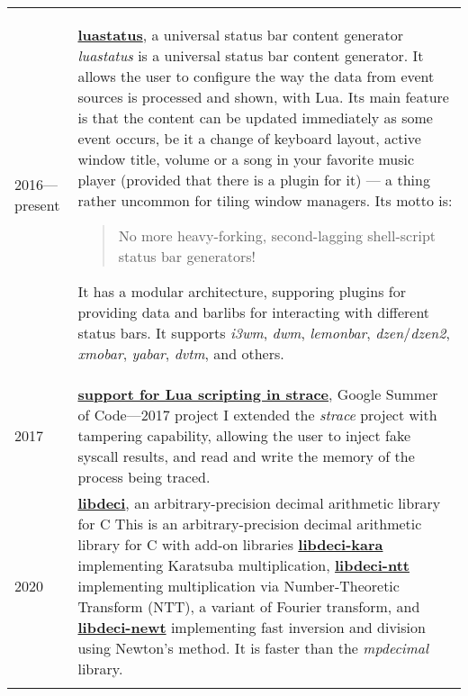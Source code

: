 \documentclass[10pt]{article}
\begin{document}
\begin{tabularx}{\textwidth}{ l X }

    2016---present & \href{https://github.com/shdown/luastatus}{\textbf{luastatus}}, a universal status bar content generator
    \newline
    \textit{luastatus} is a universal status bar content generator. It allows the user to configure the way the data from event sources is processed and shown, with Lua.
    Its main feature is that the content can be updated immediately as some event occurs, be it a change of keyboard layout, active window title, volume or a song in your favorite music player (provided that there is a plugin for it) — a thing rather uncommon for tiling window managers.
    Its motto is:
    \begin{quote}
    No more heavy-forking, second-lagging shell-script status bar generators!
    \end{quote}
    It has a modular architecture, supporing plugins for providing data and barlibs for interacting with different status bars.
    It supports \textit{i3wm}, \textit{dwm}, \textit{lemonbar}, \textit{dzen}/\textit{dzen2}, \textit{xmobar}, \textit{yabar}, \textit{dvtm}, and others.
    \\
    \medskip

    2017 & \href{http://0x1.tv/img_auth.php/f/fe/Lua-\%D1\%81\%D0\%BA\%D1\%80\%D0\%B8\%D0\%BF\%D1\%82\%D0\%B8\%D0\%BD\%D0\%B3_\%D0\%B2_strace_\%28\%D0\%92\%D0\%B8\%D0\%BA\%D1\%82\%D0\%BE\%D1\%80_\%D0\%9A\%D1\%80\%D0\%B0\%D0\%BF\%D0\%B8\%D0\%B2\%D0\%B5\%D0\%BD\%D1\%81\%D0\%BA\%D0\%B8\%D0\%B9\%2C_OSSDEVCONF-2017\%29.pdf}{\textbf{support for Lua scripting in strace}}, Google Summer of Code---2017 project
    \newline
    I extended the \textit{strace} project with tampering capability, allowing the user to inject fake syscall results, and read and write the memory of the process being traced.
    \\
    \medskip

    2020 & \href{https://github.com/shdown/libdeci}{\textbf{libdeci}}, an arbitrary-precision decimal arithmetic library for C
    \newline
    This is an arbitrary-precision decimal arithmetic library for C with add-on libraries
    \href{https://github.com/shdown/libdeci-kara}{\textbf{libdeci-kara}} implementing Karatsuba multiplication,
    \href{https://github.com/shdown/libdeci-ntt}{\textbf{libdeci-ntt}} implementing multiplication via Number-Theoretic Transform (NTT), a variant of Fourier transform,
    and \href{https://github.com/shdown/libdeci-newt}{\textbf{libdeci-newt}} implementing fast inversion and division using Newton's method.
    It is faster than the \textit{mpdecimal} library.
    \\
    \medskip


\end{tabularx}
\end{document}
